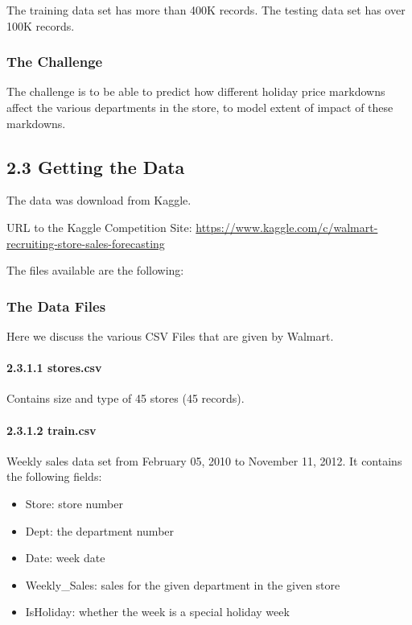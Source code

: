 \documentclass[]{article}
\begin{document}
The training data set has more than 400K records. The testing data set
has over 100K records.

\subsubsection{The Challenge}\label{the-challenge}

The challenge is to be able to predict how different holiday price
markdowns affect the various departments in the store, to model extent
of impact of these markdowns.

\subsection{2.3 Getting the Data}\label{getting-the-data}

The data was download from Kaggle.

URL to the Kaggle Competition Site:
\url{https://www.kaggle.com/c/walmart-recruiting-store-sales-forecasting}

The files available are the following:

\subsubsection{The Data Files}\label{the-data-files}

Here we discuss the various CSV Files that are given by Walmart.

\paragraph{2.3.1.1 stores.csv}\label{stores.csv}

Contains size and type of 45 stores (45 records).

\paragraph{2.3.1.2 train.csv}\label{train.csv}

Weekly sales data set from February 05, 2010 to November 11, 2012. It
contains the following fields:

\begin{itemize}
\itemsep1pt\parskip0pt
\item
  Store: store number
\item
  Dept: the department number
\item
  Date: week date
\item
  Weekly\_Sales: sales for the given department in the given store
\item
  IsHoliday: whether the week is a special holiday week
\end{itemize}
\end{document}
